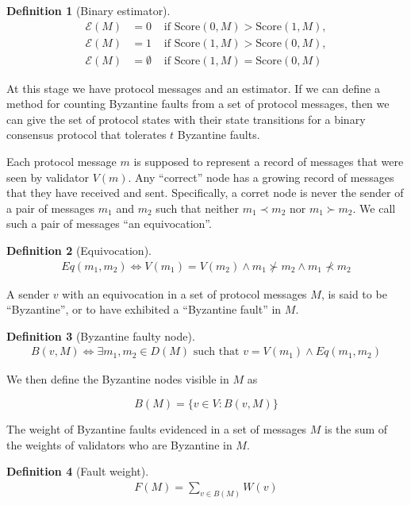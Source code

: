 \documentclass{article}
\theoremstyle{definition}
\newtheorem{defn}{Definition}[section]
\begin{document}
\begin{defn}[Binary estimator]
\begin{align}
  \mathcal{E}(M) &= 0 &\text{ if } \text{Score}(0, M) > \text{Score}(1, M), \\
  \mathcal{E}(M) &= 1 &\text{ if } \text{Score}(1, M) > \text{Score}(0, M), \\
  \mathcal{E}(M) &= \emptyset &\text{ if } \text{Score}(1, M) = \text{Score}(0, M)
\end{align}
\end{defn}

At this stage we have protocol messages and an estimator. If we can define a method for counting Byzantine faults from a set of protocol messages, then we can give the set of protocol states with their state transitions for a binary consensus protocol that tolerates $t$ Byzantine faults.

Each protocol message $m$ is supposed to represent a record of messages that were seen by validator $V(m)$. Any ``correct'' node has a growing record of messages that they have received and sent. Specifically, a corret node is never the sender of a pair of messages $m_1$ and $m_2$ such that neither $m_1 \prec m_2$ nor $m_1 \succ m_2$. We call such a pair of messages ``an equivocation''.


\begin{defn}[Equivocation]
\begin{align}
Eq(m_1, m_2) \iff V(m_1) = V(m_2) \land m_1 \nsucc m_2 \land m_1 \nprec m_2
\end{align}
\end{defn}

A sender $v$ with an equivocation in a set of protocol messages $M$, is said to be ``Byzantine'', or to have exhibited a ``Byzantine fault'' in $M$.

\begin{defn}[Byzantine faulty node]
\begin{align}
B(v,M) \iff \exists m_1, m_2 \in D(M) \text{ such that } v = V(m_1) \land Eq(m_1, m_2)
\end{align}
\end{defn}

We then define the Byzantine nodes visible in $M$ as

$$
B(M) = \{v \in V: B(v,M)\}
$$

The weight of Byzantine faults evidenced in a set of messages $M$ is the sum of the weights of validators who are Byzantine in $M$.

\begin{defn}[Fault weight]
\begin{align}
F(M) = \sum_{v \in B(M)} W(v)
\end{align}
\end{defn}
\end{document}
